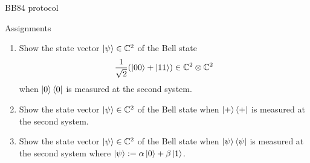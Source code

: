 \documentclass[10pt]{beamer}
\begin{document}
\begin{frame}{BB84 protocol}
\end{frame}
\fi

\begin{frame}{Assignments}
\begin{enumerate}
\setlength{\itemsep}{2em}
\item Show the state vector $\ket{\psi}\in \mathbb{C}^2$ of the Bell state
\begin{equation*}
\frac1{\sqrt{2}}(\ket{00}+\ket{11}) \in \mathbb{C}^2\otimes \mathbb{C}^2
\end{equation*}
when $\ket{0}\bra{0}$ is measured at the second system.
\item Show the state vector $\ket{\psi}\in \mathbb{C}^2$ of the Bell state
when $\ket{+}\bra{+}$ is measured at the second system.
\item Show the state vector $\ket{\psi}\in \mathbb{C}^2$ of the Bell state
when $\ket{\psi}\bra{\psi}$ is measured at the second system where $\ket{\psi}:=\alpha\ket{0}+\beta\ket{1}$.
\end{enumerate}
\end{frame}
\end{document}
